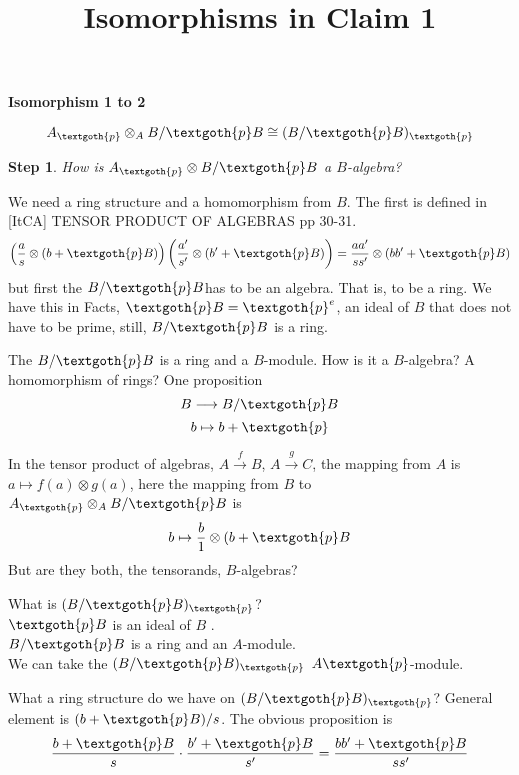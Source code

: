 \documentclass{article}
\title{Isomorphisms in Claim 1}
\newtheorem{theorem}{Step}
\begin{document}
\maketitle

\textbf{Isomorphism 1 to 2}

\[
  A_\textgoth{p} \otimes_A B/\textgoth{p}B \cong (B/\textgoth{p}B)_\textgoth{p}
\]

\begin{theorem}
How is $A_\textgoth{p} \otimes B/\textgoth{p}B$ a $B$-algebra?
\end{theorem}


We need a ring structure and a homomorphism from $B$. The first is defined in [ItCA] TENSOR PRODUCT OF ALGEBRAS pp 30-31.
\[
    \left( \frac{a}{s} \otimes (b + \textgoth{p}B) \right) \left( \frac{a'}{s'} \otimes (b' + \textgoth{p}B) \right) = \frac{aa'}{ss'} \otimes (bb' + \textgoth{p}B)
\]
but first the $B/\textgoth{p}B$has to be an algebra. That is, to be a ring. We have this in Facts, $\textgoth{p}B = \textgoth{p}^e$, an ideal of $B$ that does not have to be prime, still, $B/\textgoth{p}B$ is a ring.

The $B/\textgoth{p}B$ is a ring and a $B$-module. How is it a $B$-algebra? A homomorphism of rings? One proposition
\[
B \longrightarrow B/\textgoth{p}B
\]
\[
b \mapsto b + \textgoth{p}
\]

In the tensor product of algebras, $A \xrightarrow{f} B$, $A \xrightarrow{g} C$, the mapping from $A$ is $a \mapsto f(a) \otimes g(a)$, here the mapping from $B$ to $A_\textgoth{p} \otimes_A B/\textgoth{p}B$ is
\[
 b \mapsto \frac{b}{1} \otimes (b + \textgoth{p}B
\]
But are they both, the tensorands, $B$-algebras?

\vspace{10px}

What is $(B/\textgoth{p}B)_\textgoth{p}$? \\
$\textgoth{p}B$ is an ideal of $B$ . \\
$B/\textgoth{p}B$ is a ring and an $A$-module. \\
We can take the $(B/\textgoth{p}B)_\textgoth{p}$ $A\textgoth{p}$-module.

What a ring structure do we have on $(B/\textgoth{p}B)_\textgoth{p}$? General element is $(b + \textgoth{p}B)/s$. The obvious proposition is
\[
  \frac{b + \textgoth{p}B}{s} \cdot \frac{b' + \textgoth{p}B}{s'} = \frac{bb' + \textgoth{p}B}{ss'}
\]
\end{document}

